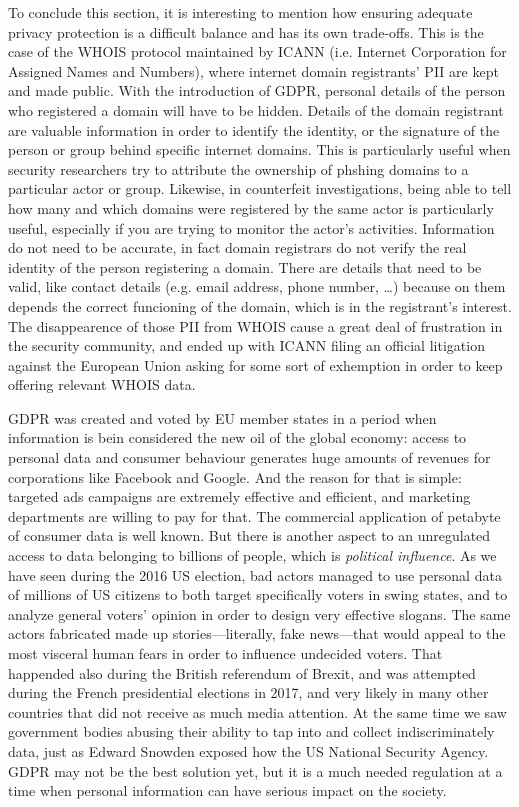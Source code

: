 To conclude this section, it is interesting to mention how ensuring
adequate privacy protection is a difficult balance and has its own trade-offs. This is
the case of the WHOIS protocol maintained by ICANN (i.e. Internet Corporation
for Assigned Names and Numbers), where internet domain registrants' PII are
kept and made public. With the introduction of GDPR, personal details of the
person who registered a domain will have to be hidden. Details of the domain
registrant are valuable information in order to identify the identity, or the
signature of the person or group behind specific internet domains. This is
particularly useful when security researchers try to attribute the ownership of
phshing domains to a particular actor or group. Likewise, in counterfeit
investigations, being able to tell how many and which domains were registered by
the same actor is particularly useful, especially if you are trying to monitor
the actor's activities. Information do not need to be accurate, in fact domain
registrars do not verify the real identity of the person registering a domain.
There are details that need to be valid, like contact details (e.g. email
address, phone number, \ldots) because on them depends the correct funcioning of
the domain, which is in the registrant's interest. The disappearence of those
PII from WHOIS cause a great deal of frustration in the security community, and
ended up with ICANN filing an official litigation against the European Union
asking for some sort of exhemption in order to keep offering relevant WHOIS
data.

GDPR was created and voted by EU member states in a period when information is
bein considered the new oil of the global economy: access to personal data and
consumer behaviour generates huge amounts of revenues for corporations like
Facebook and Google. And the reason for that is simple: targeted ads campaigns
are extremely effective and efficient, and marketing departments are willing to pay
for that. The commercial application of petabyte of consumer data is well known.
But there is another aspect to an unregulated access to data belonging to
billions of people, which is \emph{political influence}. As we have seen during
the 2016 US election, bad actors managed to use personal data of millions of US
citizens to both target specifically voters in swing states, and to analyze
general voters' opinion in order to design very effective slogans. The same
actors fabricated made up stories---literally, fake news---that would appeal to
the most visceral human fears in order to influence undecided voters. That
happended also during the British referendum of Brexit, and was attempted during
the French presidential elections in 2017, and very likely in many other
countries that did not receive as much media attention. At the same time we
saw government bodies abusing their ability to tap into and collect
indiscriminately data, just as Edward Snowden exposed how the US National
Security Agency. GDPR may not be the best solution yet, but it is a much needed
regulation at a time when personal information can have serious impact on the
society.

